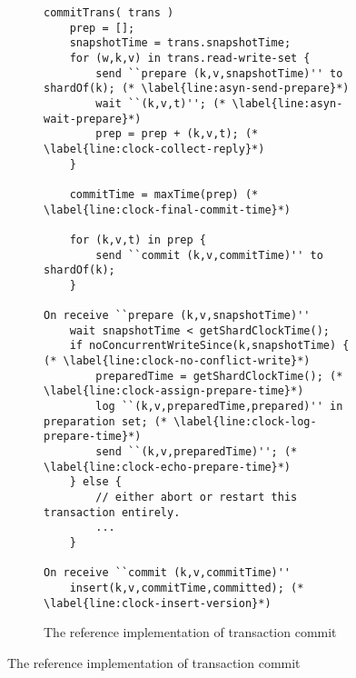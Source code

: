 \begin{figure}

\begin{subfigure}{\textwidth}
\begin{lstlisting}
commitTrans( trans )
    prep = [];
    snapshotTime = trans.snapshotTime;
    for (w,k,v) in trans.read-write-set { 
        send ``prepare (k,v,snapshotTime)'' to shardOf(k); (* \label{line:asyn-send-prepare}*)
        wait ``(k,v,t)''; (* \label{line:asyn-wait-prepare}*)
        prep = prep + (k,v,t); (* \label{line:clock-collect-reply}*)
    }

    commitTime = maxTime(prep) (* \label{line:clock-final-commit-time}*)

    for (k,v,t) in prep {
        send ``commit (k,v,commitTime)'' to shardOf(k);
    }

On receive ``prepare (k,v,snapshotTime)'' 
    wait snapshotTime < getShardClockTime(); 
    if noConcurrentWriteSince(k,snapshotTime) { (* \label{line:clock-no-conflict-write}*)
        preparedTime = getShardClockTime(); (* \label{line:clock-assign-prepare-time}*)
        log ``(k,v,preparedTime,prepared)'' in preparation set; (* \label{line:clock-log-prepare-time}*)
        send ``(k,v,preparedTime)''; (* \label{line:clock-echo-prepare-time}*)
    } else {
        // either abort or restart this transaction entirely.
        ...
    }

On receive ``commit (k,v,commitTime)'' 
    insert(k,v,commitTime,committed); (* \label{line:clock-insert-version}*)
\end{lstlisting}

\caption{The reference implementation of transaction commit}
\label{lst:clock-si-commit}
\end{subfigure}

\hrulefill


\end{figure}
